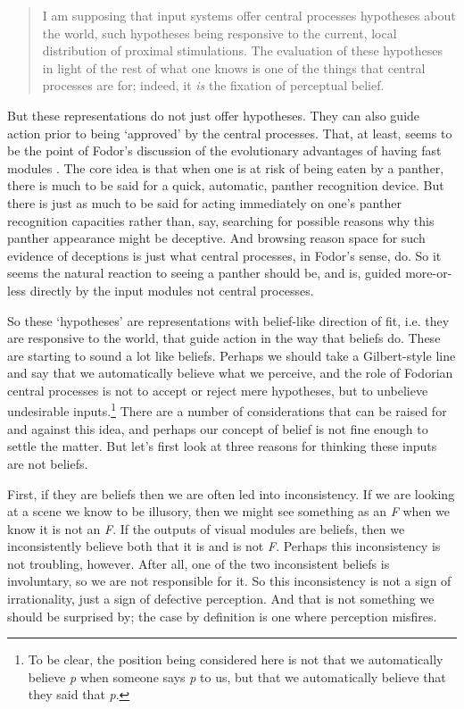 \begin{quote}
I am supposing that input systems offer central processes hypotheses about the world, such hypotheses being responsive to the current, local distribution of proximal stimulations. The evaluation of these hypotheses in light of the rest of what one knows is one of the things that central processes are for; indeed, it \textit{is} the fixation of perceptual belief.\cite[136]{Fodor1983}
\end{quote}

\noindent But these representations do not just offer hypotheses. They can also guide action prior to being `approved' by the central processes. That, at least, seems to be the point of Fodor's discussion of the evolutionary advantages of having fast modules \citep[70-71]{Fodor1983}. The core idea is that when one is at risk of being eaten by a panther, there is much to be said for a quick, automatic, panther recognition device. But there is just as much to be said for acting immediately on one's panther recognition capacities rather than, say, searching for possible reasons why this panther appearance might be deceptive. And browsing reason space for such evidence of deceptions is just what central processes, in Fodor's sense, do. So it seems the natural reaction to seeing a panther should be, and is, guided more-or-less directly by the input modules not central processes.

So these `hypotheses' are representations with belief-like direction of fit, i.e. they are responsive to the world, that guide action in the way that beliefs do. These are starting to sound a lot like beliefs. Perhaps we should take a Gilbert-style line and say that we automatically believe what we perceive, and the role of Fodorian central processes is not to accept or reject mere hypotheses, but to unbelieve undesirable inputs.\footnote{To be clear, the position being considered here is not that we automatically believe \textit{p} when someone says \textit{p} to us, but that we automatically believe that they said that \textit{p}.} There are a number of considerations that can be raised for and against this idea, and perhaps our concept of belief is not fine enough to settle the matter. But let's first look at three reasons for thinking these inputs are not beliefs.

First, if they are beliefs then we are often led into inconsistency. If we are looking at a scene we know to be illusory, then we might see something as an \textit{F} when we know it is not an \textit{F}. If the outputs of visual modules are beliefs, then we inconsistently believe both that it is and is not \textit{F}. Perhaps this inconsistency is not troubling, however. After all, one of the two inconsistent beliefs is involuntary, so we are not responsible for it. So this inconsistency is not a sign of irrationality, just a sign of defective perception. And that is not something we should be surprised by; the case by definition is one where perception misfires.

